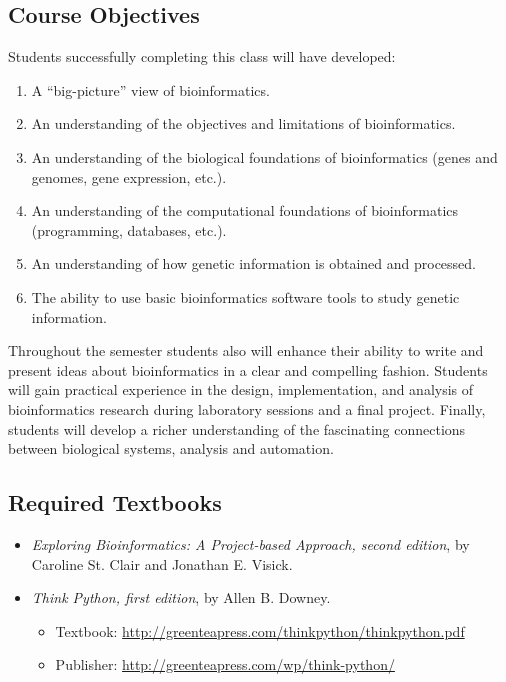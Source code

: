 \documentclass[11pt]{article} %
\begin{document}
\subsection*{\textbf{Course Objectives}}

Students successfully completing this class will have developed:
\begin{enumerate}
  \item A “big-picture” view of bioinformatics.
  \item An understanding of the objectives and limitations of bioinformatics.
  \item An understanding of the biological foundations of bioinformatics (genes and genomes, gene expression, etc.).
  \item An understanding of the computational foundations of bioinformatics (programming, databases, etc.).
  \item An understanding of how genetic information is obtained and processed.
  \item The ability to use basic bioinformatics software tools to study genetic information.
\end{enumerate}

\noindent Throughout the semester students also will enhance their ability to write and present ideas about bioinformatics in a clear and compelling fashion. Students will gain practical experience in the design, implementation, and analysis of bioinformatics research during laboratory sessions and a final project. Finally, students will develop a richer understanding of the fascinating connections between biological systems, analysis and automation.


\subsection*{\textbf{Required Textbooks}}
\begin{itemize}

\item \emph{Exploring Bioinformatics: A Project-based Approach, second edition}, by Caroline St. Clair and
Jonathan E. Visick.

\item \emph{Think Python, first edition}, by Allen B. Downey.
	\begin{itemize}
		\item Textbook: \url{http://greenteapress.com/thinkpython/thinkpython.pdf}
		\item Publisher: \url{http://greenteapress.com/wp/think-python/}
	\end{itemize}
\end{itemize}
\end{document}
